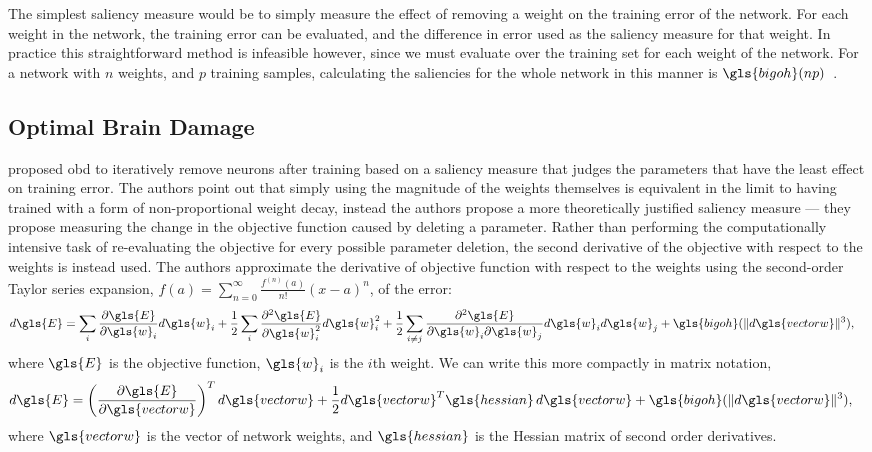 \documentclass[thesis]{subfiles}
\begin{document}
	The simplest saliency measure would be to simply measure the effect of removing a weight on the training error of the network. For each weight in the network, the training error can be evaluated, and the difference in error used as the saliency measure for that weight. In practice this straightforward method is infeasible however, since we must evaluate over the training set for each weight of the network. For a network with $n$ weights, and $p$ training samples, calculating the saliencies for the whole network in this manner is $\gls{bigoh}(np)$~\citep{hanson1989comparing}.
	
	\subsection{Optimal Brain Damage}
    \citet{lecun1989optimal} proposed \gls{obd} to iteratively remove neurons after training based on a saliency measure that judges the parameters that have the least effect on training error. The authors point out that simply using the magnitude of the weights themselves is equivalent in the limit to having trained with a form of non-proportional weight decay, instead the authors propose a more theoretically justified saliency measure --- they propose measuring the change in the objective function caused by deleting a parameter. Rather than performing the computationally intensive task of re-evaluating the objective for every possible parameter deletion, the second derivative of the objective with respect to the weights is instead used. The authors approximate the derivative of objective function with respect to the weights using the second-order Taylor series expansion, $f(a) = \sum_{n=0}^\infty \frac{f^{(n)}(a)}{n!} (x - a)^n$, of the error:
    \begin{align}
       d \gls{E} &= \sum_i \frac{\partial \gls{E}}{\partial \gls{w}_i} d \gls{w}_i + \frac{1}{2} \sum_i \frac{\partial^2 \gls{E}}{\partial \gls{w}_i^2} d \gls{w}_i^2 + \frac{1}{2} \sum_{i\neq j} \frac{\partial^2 \gls{E}}{\partial \gls{w}_i \partial \gls{w}_j} d \gls{w}_i d \gls{w}_j +\gls{bigoh}(\|d \gls{vectorw}\|^3),
    \end{align}
    where $\gls{E}$ is the objective function, $\gls{w}_i$ is the $i$th weight. We can write this more compactly in matrix notation,
    \begin{align}
       d \gls{E} &= \left( \frac{\partial \gls{E}}{\partial \gls{vectorw}} \right)^T d \gls{vectorw} +\frac{1}{2}d \gls{vectorw}^T \gls{hessian}\, d \gls{vectorw} +\gls{bigoh}(\|d \gls{vectorw}\|^3),
    \end{align}
	where $\gls{vectorw}$ is the vector of network weights, and %
	$\gls{hessian}$ is the Hessian matrix of second order derivatives. 
\end{document}
